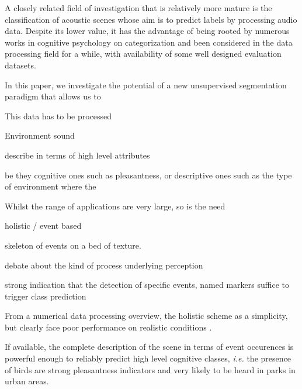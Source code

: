\documentclass[journal]{IEEEtran}
\begin{document}
A closely related field of investigation that is relatively more mature is the classification of acoustic scenes whose aim is to predict labels by processing audio data. Despite its lower value, it has the advantage of being rooted by numerous works in cognitive psychology on categorization \cite{dubois2006cognitive, maffiolo_caracterisation_1999, guastavino_ideal_2006} and been considered in the data processing field for a while, with availability of some well designed evaluation datasets. 

In this paper, we investigate the potential of a new unsupervised segmentation paradigm that allows us to 

This data has to be processed


Environment sound

describe in terms of high level attributes

be they cognitive ones such as pleasantness, or descriptive ones such as the type of environment where the 



Whilst the range of applications are very large, so is the need

holistic / event based

skeleton of events on a bed of texture.

debate about the kind of process underlying perception

strong indication that the detection of specific events, named markers suffice to trigger class prediction

From a numerical data processing overview, the holistic scheme as a simplicity, but clearly face poor performance on realistic conditions \cite{lagrange:hal-01082501}.

If available, the complete description of the scene in terms of event occurences is powerful enough to reliably predict high level cognitive classes, \textit{i.e.} the presence of birds are strong pleasantness indicators and very likely to be heard in parks in urban areas.
\end{document}
